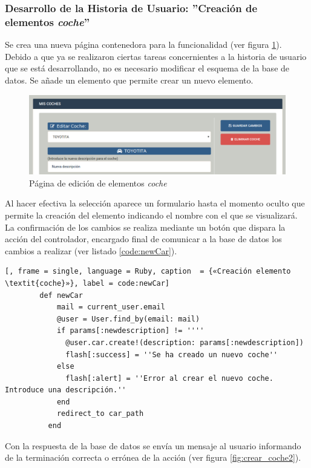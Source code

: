 	\subsubsection{Desarrollo de la Historia de Usuario: ''Creación de elementos \textit{coche}''}
	Se crea una nueva página contenedora para la funcionalidad (ver figura \ref{fig:crear_coche}). Debido a que ya se realizaron ciertas tareas concernientes a la historia de usuario que se está desarrollando, no es necesario modificar el esquema de la base de datos. Se añade un elemento que permite crear un nuevo elemento.
	
	\begin{figure}[H]
		\centering
		\includegraphics[width=15cm, fbox={\fboxrule} 4mm]{images/05-resultados/17-crear_coche.png}
		\caption{Página de edición de elementos \textit{coche}}
		\label{fig:crear_coche}
	\end{figure}	
	
	Al hacer efectiva la selección aparece un formulario hasta el momento oculto que permite la creación del elemento indicando el nombre con el que se visualizará.
	La confirmación de los cambios se realiza mediante un botón que dispara la acción del controlador, encargado final de comunicar a la base de datos los cambios a realizar (ver listado \ref{code:newCar}).
	
	\begin{lstlisting}[, frame = single, language = Ruby, caption  = {«Creación elemento \textit{coche}»}, label = code:newCar]
		def newCar
		    mail = current_user.email
		    @user = User.find_by(email: mail)    
		    if params[:newdescription] != ''''
		      @user.car.create!(description: params[:newdescription])
		      flash[:success] = ''Se ha creado un nuevo coche''
		    else
		      flash[:alert] = ''Error al crear el nuevo coche. Introduce una descripción.''
		    end
		    redirect_to car_path
		  end	
	\end{lstlisting}
	
	Con la respuesta de la base de datos se envía un mensaje al usuario informando de la terminación correcta o errónea de la acción (ver figura \ref{fig:crear_coche2}).
		
